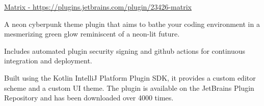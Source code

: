 \cventry
    {\href{https://plugins.jetbrains.com/plugin/23426-matrix}{Matrix - https://plugins.jetbrains.com/plugin/23426-matrix}} %
    {} %
    {} %
    {} %
    {\begin{cvitems}
        \item{A neon cyberpunk theme plugin that aims to bathe your coding environment in a mesmerizing green glow reminiscent of a neon-lit future.}
        \item{Includes automated plugin security signing and github actions for continuous integration and deployment.}
        \item{Built using the Kotlin IntelliJ Platform Plugin SDK, it provides a custom editor scheme and a custom UI theme. The plugin is available on the JetBrains Plugin Repository and has been downloaded over 4000 times.}
    \end{cvitems}}